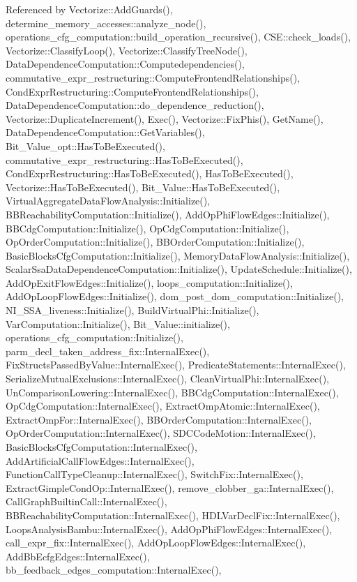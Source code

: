 Referenced by Vectorize\+::\+Add\+Guards(), determine\+\_\+memory\+\_\+accesses\+::analyze\+\_\+node(), operations\+\_\+cfg\+\_\+computation\+::build\+\_\+operation\+\_\+recursive(), C\+S\+E\+::check\+\_\+loads(), Vectorize\+::\+Classify\+Loop(), Vectorize\+::\+Classify\+Tree\+Node(), Data\+Dependence\+Computation\+::\+Computedependencies(), commutative\+\_\+expr\+\_\+restructuring\+::\+Compute\+Frontend\+Relationships(), Cond\+Expr\+Restructuring\+::\+Compute\+Frontend\+Relationships(), Data\+Dependence\+Computation\+::do\+\_\+dependence\+\_\+reduction(), Vectorize\+::\+Duplicate\+Increment(), Exec(), Vectorize\+::\+Fix\+Phis(), Get\+Name(), Data\+Dependence\+Computation\+::\+Get\+Variables(), Bit\+\_\+\+Value\+\_\+opt\+::\+Has\+To\+Be\+Executed(), commutative\+\_\+expr\+\_\+restructuring\+::\+Has\+To\+Be\+Executed(), Cond\+Expr\+Restructuring\+::\+Has\+To\+Be\+Executed(), Has\+To\+Be\+Executed(), Vectorize\+::\+Has\+To\+Be\+Executed(), Bit\+\_\+\+Value\+::\+Has\+To\+Be\+Executed(), Virtual\+Aggregate\+Data\+Flow\+Analysis\+::\+Initialize(), B\+B\+Reachability\+Computation\+::\+Initialize(), Add\+Op\+Phi\+Flow\+Edges\+::\+Initialize(), B\+B\+Cdg\+Computation\+::\+Initialize(), Op\+Cdg\+Computation\+::\+Initialize(), Op\+Order\+Computation\+::\+Initialize(), B\+B\+Order\+Computation\+::\+Initialize(), Basic\+Blocks\+Cfg\+Computation\+::\+Initialize(), Memory\+Data\+Flow\+Analysis\+::\+Initialize(), Scalar\+Ssa\+Data\+Dependence\+Computation\+::\+Initialize(), Update\+Schedule\+::\+Initialize(), Add\+Op\+Exit\+Flow\+Edges\+::\+Initialize(), loops\+\_\+computation\+::\+Initialize(), Add\+Op\+Loop\+Flow\+Edges\+::\+Initialize(), dom\+\_\+post\+\_\+dom\+\_\+computation\+::\+Initialize(), N\+I\+\_\+\+S\+S\+A\+\_\+liveness\+::\+Initialize(), Build\+Virtual\+Phi\+::\+Initialize(), Var\+Computation\+::\+Initialize(), Bit\+\_\+\+Value\+::initialize(), operations\+\_\+cfg\+\_\+computation\+::\+Initialize(), parm\+\_\+decl\+\_\+taken\+\_\+address\+\_\+fix\+::\+Internal\+Exec(), Fix\+Structs\+Passed\+By\+Value\+::\+Internal\+Exec(), Predicate\+Statements\+::\+Internal\+Exec(), Serialize\+Mutual\+Exclusions\+::\+Internal\+Exec(), Clean\+Virtual\+Phi\+::\+Internal\+Exec(), Un\+Comparison\+Lowering\+::\+Internal\+Exec(), B\+B\+Cdg\+Computation\+::\+Internal\+Exec(), Op\+Cdg\+Computation\+::\+Internal\+Exec(), Extract\+Omp\+Atomic\+::\+Internal\+Exec(), Extract\+Omp\+For\+::\+Internal\+Exec(), B\+B\+Order\+Computation\+::\+Internal\+Exec(), Op\+Order\+Computation\+::\+Internal\+Exec(), S\+D\+C\+Code\+Motion\+::\+Internal\+Exec(), Basic\+Blocks\+Cfg\+Computation\+::\+Internal\+Exec(), Add\+Artificial\+Call\+Flow\+Edges\+::\+Internal\+Exec(), Function\+Call\+Type\+Cleanup\+::\+Internal\+Exec(), Switch\+Fix\+::\+Internal\+Exec(), Extract\+Gimple\+Cond\+Op\+::\+Internal\+Exec(), remove\+\_\+clobber\+\_\+ga\+::\+Internal\+Exec(), Call\+Graph\+Builtin\+Call\+::\+Internal\+Exec(), B\+B\+Reachability\+Computation\+::\+Internal\+Exec(), H\+D\+L\+Var\+Decl\+Fix\+::\+Internal\+Exec(), Loops\+Analysis\+Bambu\+::\+Internal\+Exec(), Add\+Op\+Phi\+Flow\+Edges\+::\+Internal\+Exec(), call\+\_\+expr\+\_\+fix\+::\+Internal\+Exec(), Add\+Op\+Loop\+Flow\+Edges\+::\+Internal\+Exec(), Add\+Bb\+Ecfg\+Edges\+::\+Internal\+Exec(), bb\+\_\+feedback\+\_\+edges\+\_\+computation\+::\+Internal\+Exec(), 